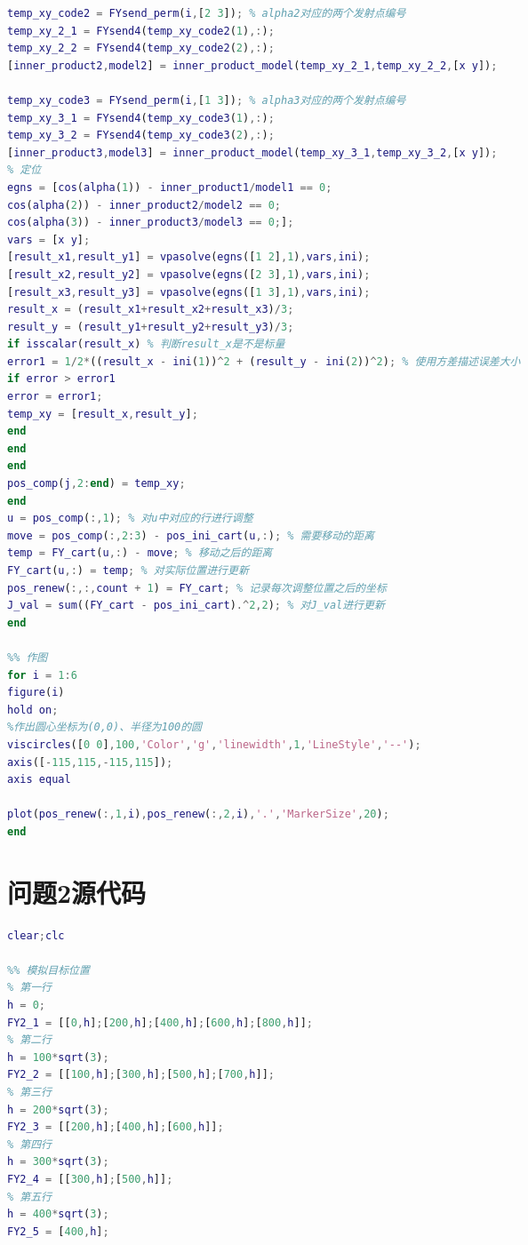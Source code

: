 \documentclass[12pt]{ctexart}
\begin{document}
\begin{spacing}{1.5}
\begin{lstlisting}[title="shumo\_B\_1\_3.m",language=matlab]
temp_xy_code2 = FYsend_perm(i,[2 3]); % alpha2对应的两个发射点编号
temp_xy_2_1 = FYsend4(temp_xy_code2(1),:);
temp_xy_2_2 = FYsend4(temp_xy_code2(2),:);
[inner_product2,model2] = inner_product_model(temp_xy_2_1,temp_xy_2_2,[x y]);

temp_xy_code3 = FYsend_perm(i,[1 3]); % alpha3对应的两个发射点编号
temp_xy_3_1 = FYsend4(temp_xy_code3(1),:);
temp_xy_3_2 = FYsend4(temp_xy_code3(2),:);
[inner_product3,model3] = inner_product_model(temp_xy_3_1,temp_xy_3_2,[x y]);
% 定位
egns = [cos(alpha(1)) - inner_product1/model1 == 0;
cos(alpha(2)) - inner_product2/model2 == 0;
cos(alpha(3)) - inner_product3/model3 == 0;];
vars = [x y];
[result_x1,result_y1] = vpasolve(egns([1 2],1),vars,ini);
[result_x2,result_y2] = vpasolve(egns([2 3],1),vars,ini);
[result_x3,result_y3] = vpasolve(egns([1 3],1),vars,ini);
result_x = (result_x1+result_x2+result_x3)/3;
result_y = (result_y1+result_y2+result_y3)/3;
if isscalar(result_x) % 判断result_x是不是标量
error1 = 1/2*((result_x - ini(1))^2 + (result_y - ini(2))^2); % 使用方差描述误差大小
if error > error1
error = error1;
temp_xy = [result_x,result_y];
end
end
end
pos_comp(j,2:end) = temp_xy;
end
u = pos_comp(:,1); % 对u中对应的行进行调整
move = pos_comp(:,2:3) - pos_ini_cart(u,:); % 需要移动的距离
temp = FY_cart(u,:) - move; % 移动之后的距离
FY_cart(u,:) = temp; % 对实际位置进行更新
pos_renew(:,:,count + 1) = FY_cart; % 记录每次调整位置之后的坐标
J_val = sum((FY_cart - pos_ini_cart).^2,2); % 对J_val进行更新
end

%% 作图
for i = 1:6
figure(i)
hold on;
%作出圆心坐标为(0,0)、半径为100的圆
viscircles([0 0],100,'Color','g','linewidth',1,'LineStyle','--');
axis([-115,115,-115,115]);
axis equal

plot(pos_renew(:,1,i),pos_renew(:,2,i),'.','MarkerSize',20);
end
\end{lstlisting}

\section{问题2源代码}
\begin{lstlisting}[title="shumo\_B\_222.m",language=matlab]
%% 数据导入，由于题目中没有给出数据，这里认为设定目标位置
clear;clc

%% 模拟目标位置
% 第一行
h = 0;
FY2_1 = [[0,h];[200,h];[400,h];[600,h];[800,h]];
% 第二行
h = 100*sqrt(3);
FY2_2 = [[100,h];[300,h];[500,h];[700,h]];
% 第三行
h = 200*sqrt(3);
FY2_3 = [[200,h];[400,h];[600,h]];
% 第四行
h = 300*sqrt(3);
FY2_4 = [[300,h];[500,h]];
% 第五行
h = 400*sqrt(3);
FY2_5 = [400,h];


\end{lstlisting}
\end{spacing}
\end{document}

